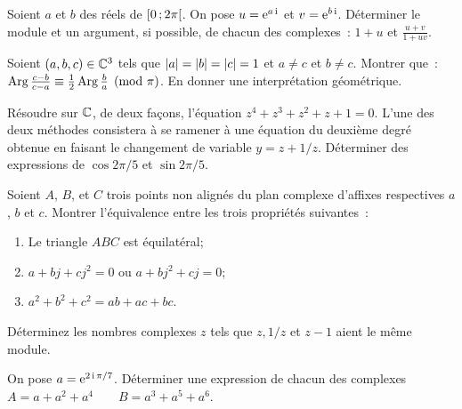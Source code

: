 \begin{exercice}
  Soient \(a\) et \(b\) des réels de \(\left[ 0 \, ; {} 2\pi \right[\). On pose \(u = 
  \operatorname{e}^{a\operatorname{i}}\) et \(v = \operatorname{e}^{b\operatorname{i}}\). Déterminer le module et un argument, si 
  possible, de chacun des complexes~: \(1 + u\) et \(\frac{u + v}{1 + uv}\).
\end{exercice}

\begin{exercice}
  Soient \((a, b, c) \in{}\mathbb{C}^3\) tels que \(\left\lvert a\right\rvert = \left\lvert b\right\rvert = \left\lvert c\right\rvert = 1\) 
  et \(a \neq c\) et \(b \neq c\). Montrer que~:\(\operatorname{Arg} \frac{c-b}{c-a} \equiv 
  \frac{1}{2} \operatorname{Arg} \frac{b}{a} \pmod \pi\). En donner une interprétation 
  géométrique.
\end{exercice}

\begin{exercice}
  Résoudre sur \(\mathbb{C}\), de deux façons, l'équation \(z^4 + z^3 + z^2 + z + 1 = 
  0\). L'une des deux méthodes consistera à se ramener à une équation du 
  deuxième degré obtenue en faisant le changement de variable \(y = z + 1/z\).  
  Déterminer des expressions de \(\cos 2\pi/5\) et \(\sin 2\pi/5\).
\end{exercice}

\begin{exercice}
  Soient \(A\), \(B\), et \(C\) trois points non alignés du plan complexe 
  d'affixes respectives \(a\), \(b\) et \(c\). Montrer l'équivalence entre les 
  trois propriétés suivantes~:
  \begin{enumerate}
    \item Le triangle \(ABC\) est équilatéral;
    \item \(a + bj + cj^2 = 0\) ou \(a + bj^2 + cj = 0\);
    \item \(a^2 + b^2 + c^2 = ab + ac + bc\).
  \end{enumerate}
\end{exercice}

\begin{exercice}
  Déterminez les nombres complexes \(z\) tels que \(z, 1/z\) et \(z-1\) aient 
  le même module.
\end{exercice}

\begin{exercice}
  On pose \(a = \operatorname{e}^{2\operatorname{i}\pi/7}\). Déterminer une expression de chacun des 
  complexes \(A = a + a^2 + a^4 \qquad B = a^3 + a^5 + a^6\).
\end{exercice}


